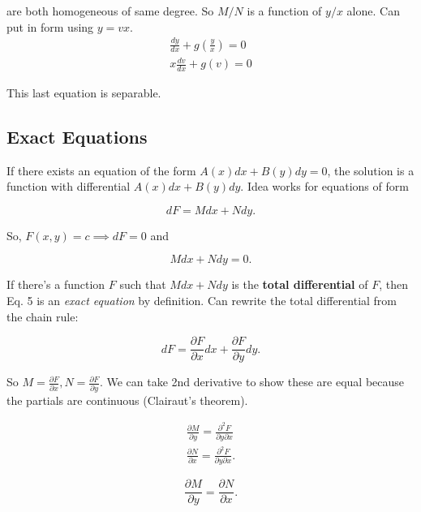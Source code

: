 are both homogeneous of same degree. So $M/N$ is a function of $y/x$ alone.
Can put in form using $y=vx$.
\begin{eqnarray}
    \frac{dy}{dx}+g(\frac{y}{x})=0\\
    x\frac{dv}{dx}+g(v)=0
\end{eqnarray}

This last equation is separable.

\subsection{Exact Equations}

If there exists an equation of the form $A(x)dx+B(y)dy=0$, the solution is a function with differential $A(x)dx+B(y)dy$.
Idea works for equations of form

\begin{equation}
    dF=Mdx+Ndy.
\end{equation}

So, $F(x,y)=c\implies dF=0$ and

\begin{equation}
    Mdx+Ndy=0.
\end{equation}

If there's a function $F$ such that $Mdx+Ndy$ is the \textbf{total differential}
of $F$, then Eq. 5 is an \textit{exact equation} by definition. Can rewrite the total differential from the chain rule:

\begin{equation}
    dF=\frac{\partial F}{\partial x}dx+\frac{\partial F}{\partial y}dy.
\end{equation}

So $M=\frac{\partial F}{\partial x},N=\frac{\partial F}{\partial y}$. We can take 2nd derivative to show these are equal because the partials are continuous (Clairaut's theorem).

\begin{eqnarray}
    \frac{\partial M}{\partial y}=\frac{\partial^2 F}{\partial y\partial x}\\
    \frac{\partial N}{\partial x}=\frac{\partial^2 F}{\partial y\partial x}.
\end{eqnarray}

\begin{definition}[Exactness]
    \begin{equation}
        \frac{\partial M}{\partial y}=\frac{\partial N}{\partial x}.
    \end{equation}
\end{definition}

